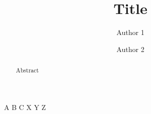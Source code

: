 \documentclass[superscriptaddress]{revtex4-2}
\begin{document}

\title{Title}

\author{Author 1}
\author{Author 2}

\begin{abstract}
  Abstract
\end{abstract}

\maketitle

\begin{thebibliography}{}
 A B C
 X Y Z
\end{thebibliography}
\end{document}
